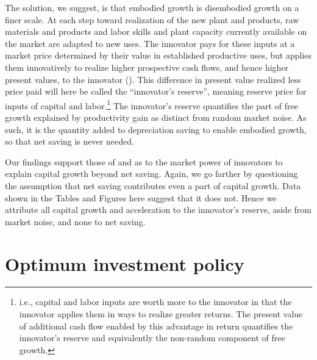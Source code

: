 \documentclass[a4paper,fleqn]{latex_styles/cas-sc}
\begin{document}
The solution, we suggest, is that embodied growth is disembodied growth
on a finer scale. At each step toward realization of the new plant and
products, raw materials and products and labor skills and plant capacity
currently available on the market are adapted to new uses. The innovator
pays for these inputs at a market price determined by their value in
established productive uses, but applies them innovatively to realize
higher prospective cash flows, and hence higher present values, to the
innovator
(\citet{marshallPrinciplesEconomics1890, schumpeterTheoryEconomicDevelopment1934}).
This difference in present value realized less price paid will here be
called the ``innovator's reserve'', meaning reserve price for inputs of
capital and labor.\footnote{i.e., capital and labor inputs are worth
  more to the innovator in that the innovator applies them in ways to
  realize greater returns. The present value of additional cash flow
  enabled by this advantage in return quantifies the innovator's reserve
  and equivalently the non-random component of free growth.} The innovator's reserve quantifies the
part of free growth explained by productivity gain as distinct from
random market noise. As such, it is the quantity added to depreciation
saving to enable embodied growth, so that net saving is never
needed.

Our findings support those of \cite{picketyCapitalIsBack2014} and \cite{kurz2023market} as to the market power of innovators to explain capital growth beyond net saving. Again, we go farther by questioning the assumption that net saving contributes even a part of capital growth. Data shown in the Tables and Figures here suggest that it does not. Hence we attribute all capital growth and acceleration to the innovator's reserve, aside from market noise, and none to net saving.


\hypertarget{optimum-investment-policy}{%
\section{Optimum investment policy}\label{optimum-investment-policy}}
\end{document}
